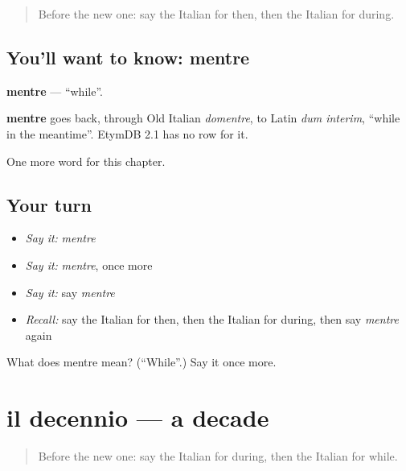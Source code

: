 \label{lesson:IT-C187-mentre}



\begin{quote}
Before the new one: say the Italian for then, then the Italian for during.
\end{quote}

\subsection*{You'll want to know: mentre}
\textbf{mentre} — \textquotedblleft{}while\textquotedblright{}.

\begin{cousinweb}
\textbf{mentre} goes back, through Old Italian \emph{domentre}, to Latin \emph{dum interim}, \textquotedblleft{}while in the meantime\textquotedblright{}. EtymDB 2.1 has no row for it.
\end{cousinweb}

\begin{grammarlens}[title={What you've built}]
One more word for this chapter.
\end{grammarlens}

\subsection*{Your turn}
\begin{itemize}
\raggedright
  \item \emph{Say it:} \emph{mentre}
  \item \emph{Say it:} \emph{mentre}, once more
  \item \emph{Say it:} say \emph{mentre}
  \item \emph{Recall:} say the Italian for then, then the Italian for during, then say \emph{mentre} again
\end{itemize}

\begin{tcolorbox}[breakable,colback=teal!4,colframe=teal!35!black,title={Before you move on}]
What does mentre mean? (\textquotedblleft{}While\textquotedblright{}.) Say it once more.
\end{tcolorbox}
\section[il decennio]{il decennio — a decade}

\label{lesson:IT-C187-decennio}



\begin{quote}
Before the new one: say the Italian for during, then the Italian for while.
\end{quote}

